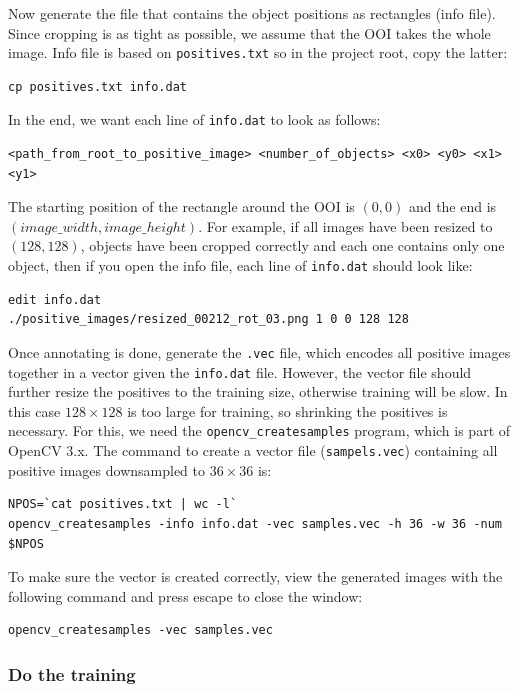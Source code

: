 \documentclass[a4paper]{article}
\begin{document}
Now generate the file that contains the object positions as rectangles (info file). Since cropping is as tight as possible, we assume that the OOI takes the whole image. Info file is based on \texttt{positives.txt} so in the project root, copy the latter:
\begin{lstlisting}[style=terminal]
cp positives.txt info.dat
\end{lstlisting}
In the end, we want each line of \texttt{info.dat} to look as follows:
\begin{verbatim}
<path_from_root_to_positive_image> <number_of_objects> <x0> <y0> <x1> <y1>
\end{verbatim}
The starting position of the rectangle around the OOI is $(0,0)$ and the end is $(image\_width, image\_height)$. For example, if all images have been resized to $(128, 128)$, objects have been cropped correctly and each one contains only one object, then if you open the info file, each line of \texttt{info.dat} should look like:
\begin{lstlisting}[style=terminal]
edit info.dat
./positive_images/resized_00212_rot_03.png 1 0 0 128 128
\end{lstlisting}
Once annotating is done, generate the \texttt{.vec} file, which encodes all positive images together in a vector given the \texttt{info.dat} file. However, the vector file should further resize the positives to the training size, otherwise training will be slow. In this case $128\times128$ is too large for training, so shrinking the positives is necessary. For this, we need the \texttt{opencv_createsamples} program, which is part of OpenCV 3.x. The command to create a vector file (\texttt{sampels.vec}) containing all positive images downsampled to $36\times 36$ is:
\begin{lstlisting}[style=terminal]
NPOS=`cat positives.txt | wc -l`
opencv_createsamples -info info.dat -vec samples.vec -h 36 -w 36 -num $NPOS
\end{lstlisting}
To make sure the vector is created correctly, view the generated images with the following command and press escape to close the window:
\begin{lstlisting}[style=terminal]
opencv_createsamples -vec samples.vec  
\end{lstlisting}




\subsubsection{Do the training}
\end{document}
